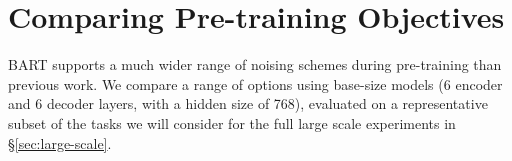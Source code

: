 \documentclass{article} %
\newcommand{\omer}[1]{{\color{blue} [Omer: #1]}}
\begin{document}





\section{Comparing Pre-training Objectives}
\label{section:ablations}
BART supports a much wider range of noising schemes during pre-training than previous work. We compare a range of options using base-size models (6 encoder and 6 decoder layers, with a hidden size of 768), evaluated on a representative subset of the tasks we will consider for the full large scale experiments in \S\ref{sec:large-scale}.
\end{document}
